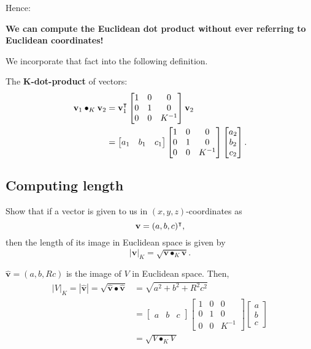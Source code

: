 \documentclass[newpage,hints,handout]{ximera}
\begin{document}
Hence:
\begin{center}
\textbf{We can compute the Euclidean dot product without ever referring to Euclidean coordinates!}
\end{center}
We incorporate that fact into the following definition.

\begin{definition}
The \textbf{$\boldsymbol{K}$-dot-product} of vectors:%
\begin{align*}
\mathbf{v}_{1}\bullet_{K}\mathbf{v}_{2}  &=\mathbf{v}_{1}^\transpose
\begin{bmatrix}
1 & 0 & 0\\
0 & 1 & 0\\
0 & 0 & K^{-1}%
\end{bmatrix}
\mathbf{v}_{2}\\
&=
\begin{bmatrix}
a_{1} & b_{1} & c_{1}%
\end{bmatrix}
\begin{bmatrix}
1 & 0 & 0\\
0 & 1 & 0\\
0 & 0 & K^{-1}%
\end{bmatrix}
\begin{bmatrix}
a_{2}\\
b_{2}\\
c_{2}%
\end{bmatrix}.
\end{align*}

\end{definition}

\subsection{Computing length}

\begin{problem}
  Show that if a vector is given to us in $(x,y,z)$-coordinates as%
\[
\mathbf{v}=(a,b,c)^\intercal,
\]
then the length of its image in Euclidean space is given by
\[
|\mathbf{v}|_K=\sqrt{\mathbf{v} \bullet_K \mathbf{v}}.
\]

\begin{freeResponse}
$\hat{\mathbf v} = \left(a,b,Rc \right)$ is the image of $V$ in Euclidean space. Then,
\begin{align*}
|V|_K = |\hat{\mathbf v}| = \sqrt{\hat{\mathbf v}\bullet\hat{\mathbf v}} 
&= \sqrt{a^{2} + b^{2} + R^{2}c^{2}} \\
&= \begin{bmatrix}
a & b & c%
\end{bmatrix}
\begin{bmatrix}
1 & 0 & 0\\
0 & 1 & 0\\
0 & 0 & K^{-1}%
\end{bmatrix}
\begin{bmatrix}
a\\
b\\
c%
\end{bmatrix} \\
&= \sqrt{V\bullet_K V}
\end{align*}
\end{freeResponse} 
\end{problem}
\end{document}
